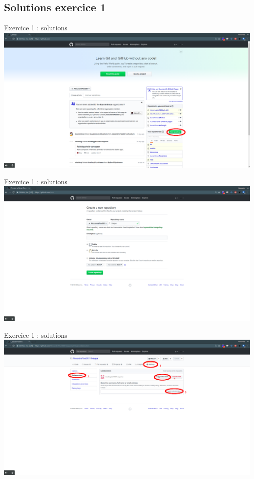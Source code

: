 \documentclass{beamer}
\begin{document}
\subsection{Solutions exercice 1}
\begin{frame}{Exercice 1 : solutions}
	\centering
    \includegraphics[scale=0.16]{img/image_exercices/repo_creat.png}
\end{frame}

\begin{frame}{Exercice 1 : solutions}
	\centering
    \includegraphics[scale=0.16]{img/image_exercices/repo_config.png}
\end{frame}

\begin{frame}{Exercice 1 : solutions}
	\centering
    \includegraphics[scale=0.16]{img/image_exercices/add_collab.png}
\end{frame}
\end{document}
